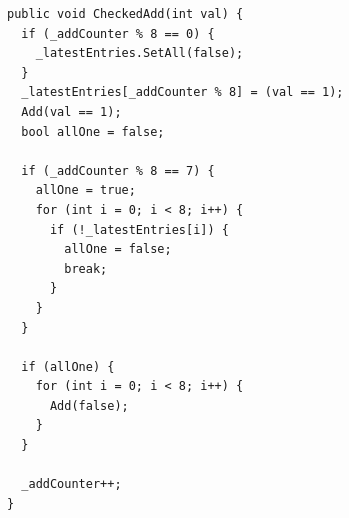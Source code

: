\begin{lstlisting}[firstnumber=26,label=lst:newCheckedAdd, caption={Improved \lstinline|CheckedAdd| in \lstinline|BitList|.
The for-loop only runs an eighth of the time.
\textbf{File:} first\textunderscore  round/CS/BitList.cs.}]
public void CheckedAdd(int val) {
  if (_addCounter % 8 == 0) {
    _latestEntries.SetAll(false);
  }
  _latestEntries[_addCounter % 8] = (val == 1);
  Add(val == 1);
  bool allOne = false;

  if (_addCounter % 8 == 7) {
    allOne = true;
    for (int i = 0; i < 8; i++) {
      if (!_latestEntries[i]) {
        allOne = false;
        break;
      }
    }
  }

  if (allOne) {
    for (int i = 0; i < 8; i++) {
      Add(false);
    }
  }

  _addCounter++;
}
\end{lstlisting}

